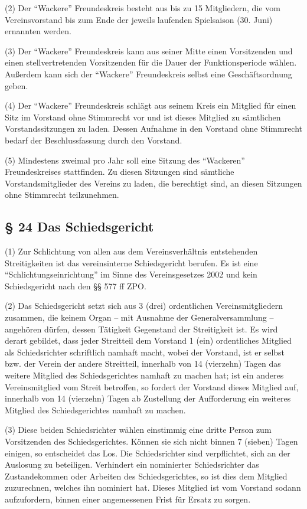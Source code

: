 \documentclass[11pt,a4paper]{article}
\begin{document}
(2)
Der "`Wackere"' Freundeskreis besteht aus bis zu 15 Mitgliedern, die vom Vereinsvorstand bis zum Ende der jeweils laufenden Spielsaison (30. Juni)
ernannten werden.

(3)
Der "`Wackere"' Freundeskreis kann aus seiner Mitte einen Vorsitzenden und einen stellvertretenden Vorsitzenden für die Dauer der Funktionsperiode wählen.
Außerdem kann sich der "`Wackere"' Freundeskreis selbst eine Geschäftsordnung geben.

(4)
Der "`Wackere"' Freundeskreis schlägt aus seinem Kreis ein Mitglied für einen Sitz im Vorstand ohne Stimmrecht vor und ist dieses Mitglied zu sämtlichen Vorstandssitzungen zu laden.
Dessen Aufnahme in den Vorstand ohne Stimmrecht bedarf der Beschlussfassung durch den Vorstand.

(5)
Mindestens zweimal pro Jahr soll eine Sitzung des "`Wackeren"' Freundeskreises stattfinden.
Zu diesen Sitzungen sind sämtliche Vorstandsmitglieder des Vereins zu laden, die berechtigt sind, an diesen Sitzungen ohne Stimmrecht teilzunehmen.

\subsection{§ 24
Das Schiedsgericht}

(1)
Zur Schlichtung von allen aus dem Vereinsverhältnis entstehenden Streitigkeiten ist das vereinsinterne Schiedsgericht berufen.
Es ist eine "`Schlichtungseinrichtung"' im Sinne des Vereinsgesetzes 2002 und kein Schiedsgericht nach den §§ 577 ff ZPO.

(2)
Das Schiedsgericht setzt sich aus 3 (drei) ordentlichen Vereinsmitgliedern zusammen, die keinem Organ – mit Ausnahme der Generalversammlung – angehören dürfen, dessen Tätigkeit Gegenstand der Streitigkeit ist.
Es wird derart gebildet, dass jeder Streitteil dem Vorstand 1 (ein) ordentliches Mitglied als Schiedsrichter schriftlich namhaft macht, wobei der Vorstand, ist er selbst bzw. der Verein der andere Streitteil, innerhalb von 14 (vierzehn) Tagen das weitere Mitglied des Schiedsgerichtes namhaft zu machen hat; ist ein anderes Vereinsmitglied vom Streit betroffen, so fordert der Vorstand dieses Mitglied auf, innerhalb von 14 (vierzehn) Tagen ab Zustellung der Aufforderung ein weiteres Mitglied des Schiedsgerichtes namhaft zu machen.

(3)
Diese beiden Schiedsrichter wählen einstimmig eine dritte Person zum Vorsitzenden des Schiedsgerichtes.
Können sie sich nicht binnen 7 (sieben)
Tagen einigen, so entscheidet das Los.
Die Schiedsrichter sind verpflichtet, sich an der Auslosung zu beteiligen.
Verhindert ein nominierter Schiedsrichter das Zustandekommen oder Arbeiten des Schiedsgerichtes, so ist dies dem Mitglied zuzurechnen, welches ihn nominiert hat.
Dieses Mitglied ist vom Vorstand sodann aufzufordern, binnen einer angemessenen Frist für Ersatz zu sorgen.
\end{document}
